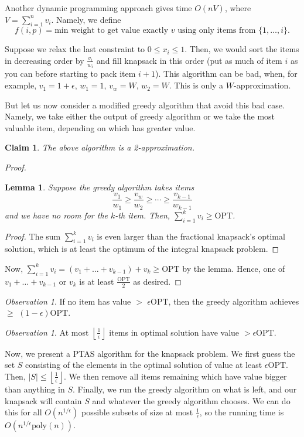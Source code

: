 \documentclass[11pt]{article}
\newtheorem{lemma}[theorem]{Lemma}
\newtheorem{claim}[theorem]{Claim}
\theoremstyle{definition}
\theoremstyle{remark}
\newtheorem{observation}[theorem]{Observation}
\begin{document}
Another dynamic programming approach gives time $O(nV)$,
where $V = \sum_{i=1}^n v_i$.
Namely, we define
\[
    f(i, p)=\text{min weight to get value exactly $v$ using only items from $\{1, \ldots, i\}$}.
\]

Suppose we relax the last constraint to $0 \leq x_i \leq 1$.
Then, we would sort the items in decreasing order by $\frac{v_i}{w_i}$
and fill knapsack in this order (put as much of item $i$ as you can before starting to pack item $i+1$).
This algorithm can be bad,
when, for example, $v_1=1+\epsilon$, $w_1 =1$, $v_w=W$, $w_2=W$.
This is only a $W$-approximation.

But let us now consider a modified greedy  algorithm that avoid this bad case.
Namely, we take either the output of greedy algorithm or we take the most valuable item,
depending on which has greater value.
\begin{claim}
    The above algorithm is a 2-approximation.
\end{claim}
\begin{proof}
    \begin{lemma}
        \label{lemma:lemma1}
        Suppose the greedy algorithm takes items 
        \[
            \frac{v_1}{w_1} \geq \frac{v_w}{w_2} \geq \cdots \geq \frac{v_{k-1}}{w_{k-1}}
        \]
        and we have no room for the $k$-th item. Then, $\sum_{i=1}^k v_i \geq \mathrm{OPT}$.
    \end{lemma}
    \begin{proof}
        The sum $\sum_{i=1}^k v_i$ is even larger than the fractional knapsack's optimal solution,
        which is at least the optimum of the integral knapsack problem.
    \end{proof}
    Now, $\sum_{i=1}^k v_i= (v_1+\ldots+v_{k-1}) + v_k \geq \mathrm{OPT}$ by the lemma.
    Hence, one of $v_1 + \ldots + v_{k-1}$ or $v_k$ is at least $\frac{\mathrm{OPT}}{2}$ as desired.
\end{proof}

\begin{observation}
    If no item has value $>$ $\epsilon \mathrm{OPT}$, then the greedy algorithm achieves $\geq$ $(1-\epsilon) \mathrm{OPT}$.
\end{observation}
\begin{observation}
    At most $\left \lfloor \frac{1}{\epsilon} \right \rfloor$ items in optimal solution have value $> \epsilon \mathrm{OPT}$.
\end{observation}
Now, we present a PTAS algorithm for the knapsack problem.
We first guess the set $S$
consisting of the elements in the optimal solution of value at least $\epsilon \mathrm{OPT}$.
Then, $|S| \leq \left \lfloor \frac{1}{\epsilon} \right \rfloor$.
We then remove all items remaining which have value bigger than anything in $S$.
Finally, we run the greedy algorithm on what is left,
and our knapsack will contain $S$ and whatever the greedy algorithm chooses.
We can do this for all $O(n^{1/\epsilon})$ possible subsets of size at most $\frac{1}{\epsilon}$,
so the running time is $O(n^{1/\epsilon}  \mathrm{poly}(n))$.
\end{document}
